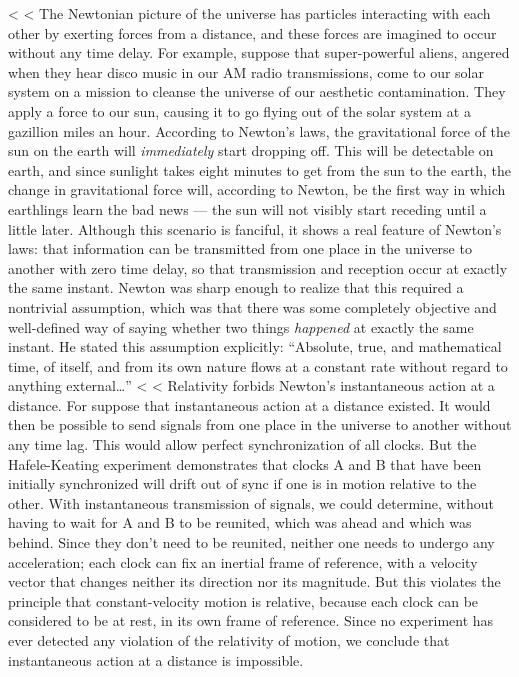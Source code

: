 
<%
<%
The Newtonian picture of the universe has particles interacting with each other by exerting
forces from a distance, and these forces are imagined to occur without any time
delay. For example, suppose that super-powerful aliens, angered when they hear disco
music in our AM radio transmissions, come to our solar system on a mission to
cleanse the universe of our aesthetic contamination. They apply a force to our
sun, causing it to go flying out of the solar system at a gazillion miles an hour. According to Newton's
laws, the gravitational force of the sun on
the earth will \emph{immediately} start dropping off. This will be detectable on earth,
and since sunlight takes eight minutes to get from the sun to the earth, the change in gravitational force
will, according to Newton, be the first way in which earthlings learn the bad news --- the sun will not
visibly start receding until a little later.
Although this scenario is fanciful, it shows
a real feature of Newton's laws: that information can be transmitted from one place in the universe to another with zero time delay,
so that transmission and reception occur at exactly the same instant.
Newton was sharp enough to realize that this required a nontrivial assumption,
which was that there was some completely objective and well-defined way of saying whether
two things \emph{happened} at exactly the same instant. He stated this assumption explicitly:
``Absolute, true, and mathematical time, of itself, and from its own nature flows
at a constant rate without regard to anything external\ldots''
<%
<%
Relativity forbids Newton's instantaneous action at a distance. For suppose that instantaneous action at a distance
existed. It would then be possible to send signals from one place in the universe to another without any time lag.
This would allow perfect synchronization of all clocks. But the Hafele-Keating experiment demonstrates that
clocks A and B that have been initially synchronized will drift out of sync
if one is in motion relative to the other.
With instantaneous transmission of signals, we could determine, without having to wait for A and B to be reunited,
which was ahead and which was behind. Since they don't need to be reunited, neither one needs to undergo any acceleration;
each clock can fix an inertial frame of reference, with a velocity vector that changes neither its direction nor its magnitude.
But this violates the principle that constant-velocity motion is relative, because each clock
can be considered to be at rest, in its own frame of reference. Since no experiment has ever detected any violation
of the relativity of motion, we conclude that instantaneous action at a distance is impossible.

